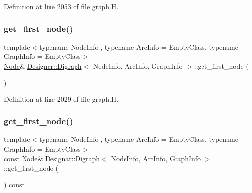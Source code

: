 Definition at line 2053 of file graph.\+H.

\mbox{\label{class_designar_1_1_digraph_a420caa785d93decc7b096de9e51644e7}} 
\subsubsection{\texorpdfstring{get\+\_\+first\+\_\+node()}{get\_first\_node()}\hspace{0.1cm}{\footnotesize\ttfamily [1/2]}}
{\footnotesize\ttfamily template$<$typename Node\+Info , typename Arc\+Info  = Empty\+Class, typename Graph\+Info  = Empty\+Class$>$ \\
\hyperlink{class_designar_1_1_digraph_a4dc921c41a480b7946a04170e997d8ae}{Node}\& \hyperlink{class_designar_1_1_digraph}{Designar\+::\+Digraph}$<$ Node\+Info, Arc\+Info, Graph\+Info $>$\+::get\+\_\+first\+\_\+node (\begin{DoxyParamCaption}{ }\end{DoxyParamCaption})\hspace{0.3cm}{\ttfamily [inline]}}



Definition at line 2029 of file graph.\+H.

\mbox{\label{class_designar_1_1_digraph_ada5266ac3e2ed091a37c434dd7484bb9}} 
\subsubsection{\texorpdfstring{get\+\_\+first\+\_\+node()}{get\_first\_node()}\hspace{0.1cm}{\footnotesize\ttfamily [2/2]}}
{\footnotesize\ttfamily template$<$typename Node\+Info , typename Arc\+Info  = Empty\+Class, typename Graph\+Info  = Empty\+Class$>$ \\
const \hyperlink{class_designar_1_1_digraph_a4dc921c41a480b7946a04170e997d8ae}{Node}\& \hyperlink{class_designar_1_1_digraph}{Designar\+::\+Digraph}$<$ Node\+Info, Arc\+Info, Graph\+Info $>$\+::get\+\_\+first\+\_\+node (\begin{DoxyParamCaption}{ }\end{DoxyParamCaption}) const\hspace{0.3cm}{\ttfamily [inline]}}




